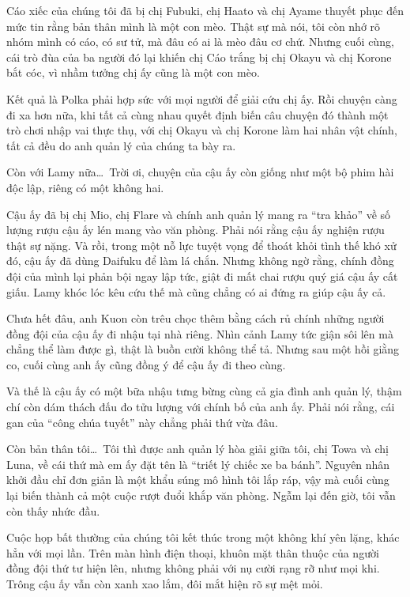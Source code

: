 \documentclass[../main.tex]{subfiles}
\begin{document}
Cáo xiếc của chúng tôi đã bị chị Fubuki, chị Haato và chị Ayame thuyết phục đến mức tin rằng bản thân mình là một con mèo. Thật sự mà nói, tôi còn nhớ rõ nhóm mình có cáo, có sư tử, mà đâu có ai là mèo đâu cơ chứ. Nhưng cuối cùng, cái trò đùa của ba người đó lại khiến chị Cáo trắng bị chị Okayu và chị Korone bắt cóc, vì nhầm tưởng chị ấy cũng là một con mèo.

Kết quả là Polka phải hợp sức với mọi người để giải cứu chị ấy. Rồi chuyện càng đi xa hơn nữa, khi tất cả cùng nhau quyết định biến câu chuyện đó thành một trò chơi nhập vai thực thụ, với chị Okayu và chị Korone làm hai nhân vật chính, tất cả đều do anh quản lý của chúng ta bày ra.

Còn với Lamy nữa\dots\ Trời ơi, chuyện của cậu ấy còn giống như một bộ phim hài độc lập, riêng có một không hai.

Cậu ấy đã bị chị Mio, chị Flare và chính anh quản lý mang ra ``tra khảo'' về số lượng rượu cậu ấy lén mang vào văn phòng. Phải nói rằng cậu ấy nghiện rượu thật sự nặng. Và rồi, trong một nỗ lực tuyệt vọng để thoát khỏi tình thế khó xử đó, cậu ấy đã dùng Daifuku để làm lá chắn. Nhưng không ngờ rằng, chính đồng đội của mình lại phản bội ngay lập tức, giật đi mất chai rượu quý giá cậu ấy cất giấu. Lamy khóc lóc kêu cứu thế mà cũng chẳng có ai đứng ra giúp cậu ấy cả.

Chưa hết đâu, anh Kuon còn trêu chọc thêm bằng cách rủ chính những người đồng đội của cậu ấy đi nhậu tại nhà riêng. Nhìn cảnh Lamy tức giận sôi lên mà chẳng thể làm được gì, thật là buồn cười không thể tả. Nhưng sau một hồi giằng co, cuối cùng anh ấy cũng đồng ý để cậu ấy đi theo cùng.

Và thế là cậu ấy có một bữa nhậu tưng bừng cùng cả gia đình anh quản lý, thậm chí còn dám thách đấu đo tửu lượng với chính bố của anh ấy. Phải nói rằng, cái gan của ``công chúa tuyết'' này chẳng phải thứ vừa đâu.

Còn bản thân tôi\dots\ Tôi thì được anh quản lý hòa giải giữa tôi, chị Towa và chị Luna, về cái thứ mà em ấy đặt tên là ``triết lý chiếc xe ba bánh''. Nguyên nhân khởi đầu chỉ đơn giản là một khẩu súng mô hình tôi lắp ráp, vậy mà cuối cùng lại biến thành cả một cuộc rượt đuổi khắp văn phòng. Ngẫm lại đến giờ, tôi vẫn còn thấy nhức đầu.

Cuộc họp bất thường của chúng tôi kết thúc trong một không khí yên lặng, khác hẳn với mọi lần. Trên màn hình điện thoại, khuôn mặt thân thuộc của người đồng đội thứ tư hiện lên, nhưng không phải với nụ cười rạng rỡ như mọi khi. Trông cậu ấy vẫn còn xanh xao lắm, đôi mắt hiện rõ sự mệt mỏi.
\end{document}

